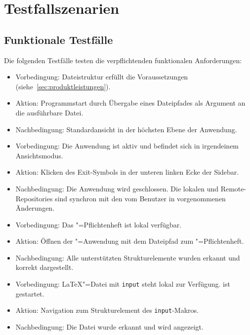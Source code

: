 \section{Testfallszenarien}
\label{sec:testfallszenarien}

\subsection{Funktionale Testfälle}
\label{subsec:funktionale-testfaelle}

Die folgenden Testfälle testen die verpflichtenden funktionalen Anforderungen:

\begin{itemize}
  \item Vorbedingung: Dateistruktur erfüllt die Voraussetzungen (siehe~\ref{sec:produktleistungen}).
  \item Aktion: Programmstart durch Übergabe eines Dateipfades als Argument an die ausführbare Datei.
  \item Nachbedingung: Standardansicht in der höchsten Ebene der Anwendung.
\end{itemize}

\begin{itemize}
  \item Vorbedingung: Die Anwendung ist aktiv und befindet sich in irgendeinem Ansichtsmodus.
  \item Aktion: Klicken des Exit-Symbols in der unteren linken Ecke der Sidebar.
  \item Nachbedingung: Die Anwendung wird geschlossen.
  Die lokalen und Remote-Repositories sind synchron mit den vom Benutzer in \texla{} vorgenommenen Änderungen.
\end{itemize}

\begin{itemize}
  \item Vorbedingung: Das \texla"=Pflichtenheft ist lokal verfügbar.
  \item Aktion: Öffnen der \texla"=Anwendung mit dem Dateipfad zum \texla"=Pflichtenheft.
  \item Nachbedingung: Alle unterstützten Strukturelemente wurden erkannt und korrekt dargestellt.
\end{itemize}

\clearpage

\begin{itemize}
  \item Vorbedingung: \LaTeX"=Datei mit \verb|input| steht lokal zur Verfügung.
  \texla{} ist gestartet.
  \item Aktion: Navigation zum Strukturelement des \verb|input|-Makros.
  \item Nachbedingung: Die Datei wurde erkannt und wird angezeigt.
\end{itemize}

